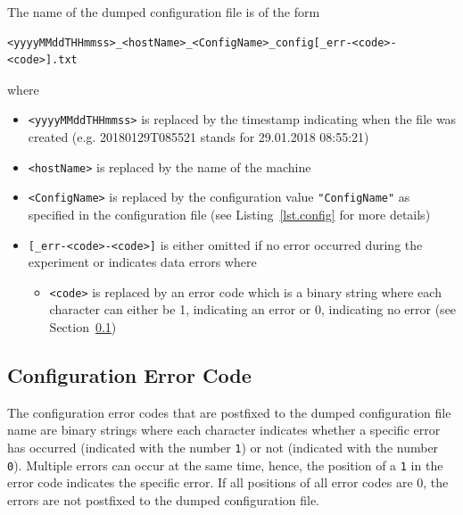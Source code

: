\documentclass[a4paper,oneside]{book}
\begin{document}
The name of the dumped configuration file is of the form
\begin{lstlisting}
<yyyyMMddTHHmmss>_<hostName>_<ConfigName>_config[_err-<code>-<code>].txt
\end{lstlisting}
where
\begin{itemize}
    \item \texttt{<yyyyMMddTHHmmss>} is replaced by the timestamp indicating when the file was created (e.g. 20180129T085521 stands for 29.01.2018 08:55:21)
    \item \texttt{<hostName>} is replaced by the name of the machine
    \item \texttt{<ConfigName>} is replaced by the configuration value \texttt{"ConfigName"} as specified in the configuration file (see Listing~\ref{lst.config} for more details)
    \item \texttt{[\_err-<code>-<code>]} is either omitted if no error occurred during the experiment or indicates data errors where
        \begin{itemize}
            \item \texttt{<code>} is replaced by an error code which is a binary string where each character can either be 1, indicating an error or 0, indicating no error (see Section~\ref{sect.config.error})
        \end{itemize}
\end{itemize}

\subsection{Configuration Error Code}
\label{sect.config.error}
The configuration error codes that are postfixed to the dumped configuration file name are binary strings where each character indicates whether a specific error has occurred (indicated with the number \texttt{1}) or not (indicated with the number \texttt{0}).
Multiple errors can occur at the same time, hence, the position of a \texttt{1} in the error code indicates the specific error.
If all positions of all error codes are 0, the errors are not postfixed to the dumped configuration file.
\end{document}
